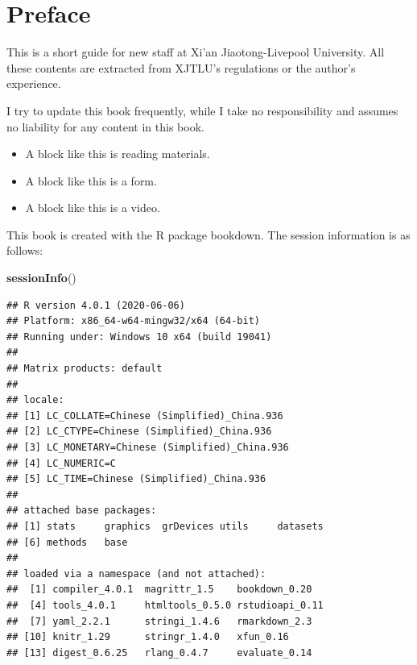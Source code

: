 \documentclass[
]{book}
\author{}
\date{\vspace{-2.5em}}
\newenvironment{Shaded}{\begin{snugshade}}{\end{snugshade}}
\newcommand{\KeywordTok}[1]{\textcolor[rgb]{0.13,0.29,0.53}{\textbf{#1}}}
\newcommand{\NormalTok}[1]{#1}
\newenvironment{rmdblock}[1]
  {\begin{shaded*}
  \begin{itemize}
  \renewcommand{\labelitemi}{
    \raisebox{-.7\height}[0pt][0pt]{
      {\setkeys{Gin}{width=2em,keepaspectratio}\texttt{[image: image/\#1]}}
    }
  }
  \item
  }
  {
  \end{itemize}
  \end{shaded*}
  }
\newenvironment{rmdas}
  {\begin{rmdblock}{as}}
  {\end{rmdblock}}
\newenvironment{rmdvd}
  {\begin{rmdblock}{vd}}
  {\end{rmdblock}}
\newenvironment{rmdrd}
  {\begin{rmdblock}{rd}}
  {\end{rmdblock}}
\begin{document}


\thispagestyle{empty}

\setlength{\abovedisplayskip}{-5pt}
\setlength{\abovedisplayshortskip}{-5pt}

{
\hypersetup{linkcolor=}
\setcounter{tocdepth}{1}
\tableofcontents
}
\frontmatter

\hypertarget{preface}{%
\chapter{Preface}\label{preface}}

This is a short guide for new staff at Xi'an Jiaotong-Livepool University. All these contents are extracted from XJTLU's regulations or the author's experience.

I try to update this book frequently, while I take no responsibility and assumes no liability for any content in this book.

\begin{rmdrd}
A block like this is reading materials.
\end{rmdrd}

\begin{rmdas}
A block like this is a form.
\end{rmdas}

\begin{rmdvd}
A block like this is a video.
\end{rmdvd}

This book is created with the R package bookdown. The session information is as follows:

\begin{Shaded}
\begin{Highlighting}[]
\KeywordTok{sessionInfo}\NormalTok{()}
\end{Highlighting}
\end{Shaded}

\begin{verbatim}
## R version 4.0.1 (2020-06-06)
## Platform: x86_64-w64-mingw32/x64 (64-bit)
## Running under: Windows 10 x64 (build 19041)
## 
## Matrix products: default
## 
## locale:
## [1] LC_COLLATE=Chinese (Simplified)_China.936 
## [2] LC_CTYPE=Chinese (Simplified)_China.936   
## [3] LC_MONETARY=Chinese (Simplified)_China.936
## [4] LC_NUMERIC=C                              
## [5] LC_TIME=Chinese (Simplified)_China.936    
## 
## attached base packages:
## [1] stats     graphics  grDevices utils     datasets 
## [6] methods   base     
## 
## loaded via a namespace (and not attached):
##  [1] compiler_4.0.1  magrittr_1.5    bookdown_0.20  
##  [4] tools_4.0.1     htmltools_0.5.0 rstudioapi_0.11
##  [7] yaml_2.2.1      stringi_1.4.6   rmarkdown_2.3  
## [10] knitr_1.29      stringr_1.4.0   xfun_0.16      
## [13] digest_0.6.25   rlang_0.4.7     evaluate_0.14
\end{verbatim}
\end{document}
